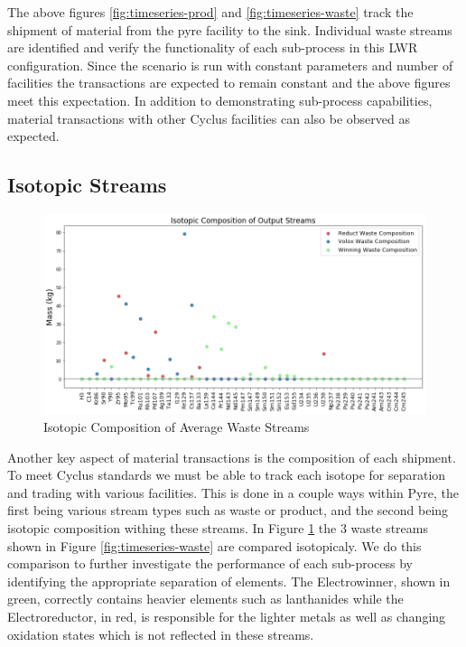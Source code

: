 The above figures \ref{fig:timeseries-prod} and \ref{fig:timeseries-waste} track the shipment of material from the pyre facility to the sink.
Individual waste streams are identified and verify the functionality of each sub-process in this LWR configuration. Since the scenario is run with
constant parameters and number of facilities the transactions are expected to remain constant and the above figures meet this expectation.
In addition to demonstrating sub-process capabilities, material transactions with other Cyclus facilities can also be observed as expected.

\subsection{Isotopic Streams}
\begin{figure} [h]
	\includegraphics[width=\linewidth]{images/avg-isotope-comp}
	\caption{Isotopic Composition of Average Waste Streams}
	\label{fig:avg-isotope-comp}
\end{figure}

Another key aspect of material transactions is the composition of each shipment. To meet Cyclus standards we must be able to track each isotope for
separation and trading with various facilities. This is done in a couple ways within Pyre, the first being various stream types such as waste or product,
and the second being isotopic composition withing these streams. In Figure \ref{fig:avg-isotope-comp} the 3 waste streams shown in Figure \ref{fig:timeseries-waste}
are compared isotopicaly. We do this comparison to further investigate the performance of each sub-process by identifying the appropriate separation of elements.
The Electrowinner, shown in green, correctly contains heavier elements such as lanthanides while the Electroreductor, in red, is responsible for the lighter metals
as well as changing oxidation states which is not reflected in these streams.

